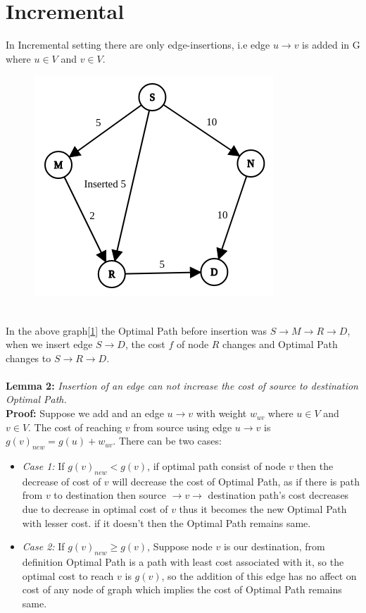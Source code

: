 \documentclass[a4paper]{article}
\begin{document}
\section{Incremental}
In Incremental setting there are only edge-insertions, i.e edge $u \rightarrow v $ is added in G where $u\in V $ and $v \in V$.
\begin{figure}[h!]
    \centering
    \includegraphics[scale=0.4]{img/insert1.png}
    \caption{}
    \label{fig:insert_graph}
\end{figure}\\
In the above graph[\ref{fig:insert_graph}] the Optimal Path before insertion was $S \rightarrow M \rightarrow R \rightarrow D$, when we insert edge $S \rightarrow D$, the cost $f$ of node $R$ changes and Optimal Path changes to $S \rightarrow R \rightarrow D$.\\
\\
\hypertarget{Lemma 2}{\textbf{Lemma 2:}} \textit{Insertion of an edge can not increase the cost of source to destination Optimal Path.}\\
\textbf{Proof:} Suppose we add and an edge $u \rightarrow v $ with weight $w_{uv}$ where $u \in V$ and $v \in V$. The cost of reaching $v$ from source using edge $u \rightarrow v$ is $g(v)_{new} = g(u) + w_{uv}$. There can be two cases:
\begin{itemize}[label={}]
    \item \textit{Case 1:} If $g(v)_{new} < g(v)$, if optimal path consist of node $v$ then the decrease of cost of $v$ will decrease the cost of Optimal Path, as if there is path from $v$ to destination then source $\rightarrow v \rightarrow$ destination path's cost decreases due to decrease in optimal cost of $v$ thus it becomes the new Optimal Path with lesser cost. if it doesn't then the Optimal Path remains same.
    
    \item \textit{Case 2:} If $g(v)_{new} \geq g(v)$,  Suppose node $v$ is our destination, from definition Optimal Path is a path with least cost associated with it, so the optimal cost to reach $v$ is $g(v)$, so the addition of this edge has no affect on cost of any node of graph which implies the cost of Optimal Path remains same.
\end{itemize}
\end{document}
